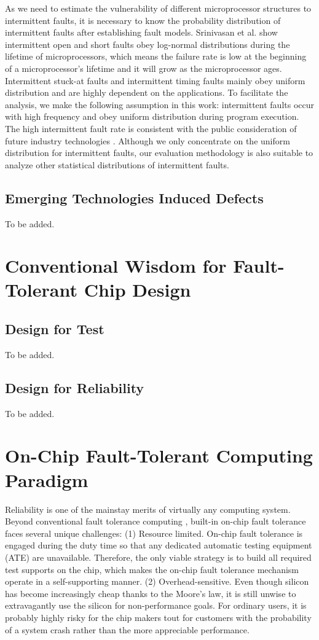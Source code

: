 As we need to estimate the vulnerability of different microprocessor structures to intermittent faults, it is necessary to know the probability distribution of intermittent faults after establishing fault models. Srinivasan et al. \cite{srinivasan2005exploiting} show intermittent open and short faults obey log-normal distributions during the lifetime of microprocessors, which means the failure rate is low at the beginning of a microprocessor’s lifetime and it will grow as the microprocessor ages. Intermittent stuck-at faults and intermittent timing faults mainly obey uniform distribution and are highly dependent on the applications. To facilitate the analysis, we make the following assumption in this work: intermittent faults occur with high frequency and obey uniform distribution during program execution. The high intermittent fault rate is consistent with the public consideration of future industry technologies \cite{borkar2003parameter}. Although we only concentrate on the uniform distribution for intermittent faults, our evaluation methodology is also suitable to analyze other statistical distributions of intermittent faults.

\subsection{Emerging Technologies Induced Defects}
To be added.

\section{Conventional Wisdom for Fault-Tolerant Chip Design}
\subsection{Design for Test}
To be added.

\subsection{Design for Reliability}
To be added.

\section{On-Chip Fault-Tolerant Computing Paradigm}
Reliability is one of the mainstay merits of virtually any computing system. Beyond conventional fault tolerance computing \cite{degradation_05}, built-in on-chip fault tolerance faces several unique challenges: (1) Resource limited. On-chip fault tolerance is engaged during the duty time so that any dedicated automatic testing equipment (ATE) are unavailable. Therefore, the only viable strategy is to build all required test supports on the chip, which makes the on-chip fault tolerance mechanism operate in a self-supporting manner. (2) Overhead-sensitive. Even though silicon has become increasingly cheap thanks to the Moore's law, it is still unwise to extravagantly use the silicon for non-performance goals. For ordinary users, it is probably highly risky for the chip makers tout for customers with the probability of a system crash rather than the more appreciable performance.

